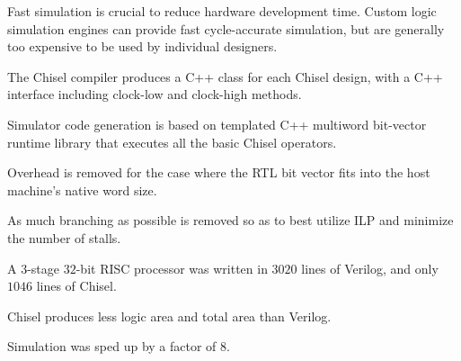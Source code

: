 \documentclass[a4paper,11pt]{article}
\begin{document}
Fast simulation is crucial to reduce hardware development time. Custom logic simulation engines can provide fast cycle-accurate simulation, but are generally too expensive to be used by individual designers.

The Chisel compiler produces a C++ class for each Chisel design, with a C++ interface including clock-low and clock-high methods.

Simulator code generation is based on templated C++ multiword bit-vector runtime library that executes all the basic Chisel operators.

Overhead is removed for the case where the RTL bit vector fits into the host machine's native word size.

As much branching as possible is removed so as to best utilize ILP and minimize the number of stalls.

A $3$-stage $32$-bit RISC processor was written in $3020$ lines of Verilog, and only $1046$ lines of Chisel.

Chisel produces less logic area and total area than Verilog.

Simulation was sped up by a factor of $8$.
\end{document}
